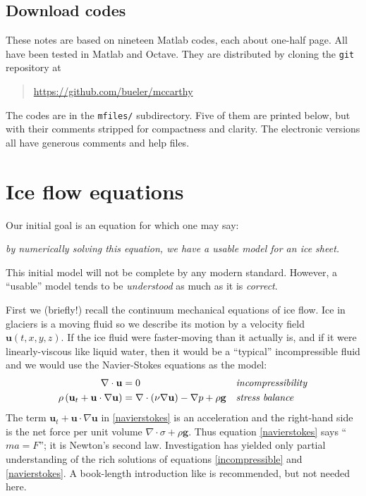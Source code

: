 \documentclass[letterpaper,final,12pt,reqno]{amsart}
\begin{document}
\subsection*{Download codes}  These notes are based on nineteen Matlab codes, each about one-half page.  All have been tested in Matlab and Octave.  They are distributed by cloning the \texttt{git} repository at
\begin{quote}
\url{https://github.com/bueler/mccarthy}
\end{quote}
\noindent The codes are in the \texttt{mfiles/} subdirectory.  Five of them are printed below, but with their comments stripped for compactness and clarity.  The electronic versions all have generous comments and help files.


\section{Ice flow equations}  \label{sec:continuum}

Our initial goal is an equation for which one may say:
\begin{center}
\emph{by numerically solving this equation, we have a usable model for an ice sheet.}
\end{center}
\noindent This initial model will not be complete by any modern standard.  However, a ``usable'' model tends to be \emph{understood} as much as it is \emph{correct}.

First we (briefly!) recall the continuum mechanical equations of ice flow.  Ice in glaciers is a moving fluid so we describe its motion by a velocity field $\mathbf{u}(t,x,y,z)$.  If the ice fluid were faster-moving than it actually is, and if it were linearly-viscous like liquid water, then it would be a ``typical'' incompressible fluid and we would use the Navier-Stokes equations as the model:
\begin{align}
\nabla \cdot \mathbf{u} &= 0 &&\text{\emph{incompressibility}} \label{incompressible} \\
\rho \left(\mathbf{u}_t + \mathbf{u}\cdot\nabla \mathbf{u}\right) &= \nabla \cdot (\nu \nabla \mathbf{u}) - \nabla p + \rho \mathbf{g} &&\text{\emph{stress balance}} \label{navierstokes}
\end{align}
The term $\mathbf{u}_t + \mathbf{u}\cdot\nabla \mathbf{u}$ in \eqref{navierstokes} is an acceleration and the right-hand side is the net force per unit volume $\nabla \cdot \sigma + \rho \mathbf{g}$.  Thus equation \eqref{navierstokes} says ``$ma=F$''; it is Newton's second law.  Investigation has yielded only partial understanding of the rich solutions of equations \eqref{incompressible} and \eqref{navierstokes}.  A book-length introduction like \cite{Acheson} is recommended, but not needed here.
\end{document}
